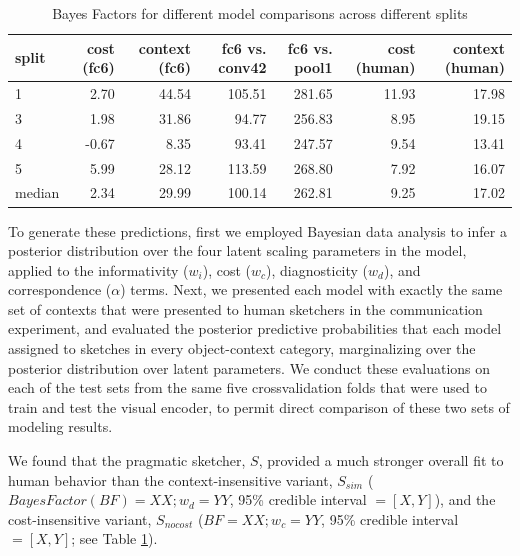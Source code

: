 \documentclass[9pt,twocolumn,twoside]{pnas-new}
\begin{document}
\begin{table}[ht]
\centering
\begin{tabular}{lrrrrrr}
  \hline
split & \multicolumn{1}{p{0.35in}}{\centering cost (fc6)} & \multicolumn{1}{p{0.35in}}{\centering context (fc6)} & \multicolumn{1}{p{0.35in}}{\centering fc6 vs. conv42} & \multicolumn{1}{p{0.35in}}{\centering fc6 vs. pool1} & \multicolumn{1}{p{0.35in}}{\centering cost (human)} & \multicolumn{1}{p{0.35in}}{\centering context (human)} \\ 
  \hline
1 & 2.70 & 44.54 & 105.51 & 281.65 & 11.93 & 17.98 \\ 
  3 & 1.98 & 31.86 & 94.77 & 256.83 & 8.95 & 19.15 \\ 
  4 & -0.67 & 8.35 & 93.41 & 247.57 & 9.54 & 13.41 \\ 
  5 & 5.99 & 28.12 & 113.59 & 268.80 & 7.92 & 16.07 \\ 
  median & 2.34 & 29.99 & 100.14 & 262.81 & 9.25 & 17.02 \\ 
   \hline
\end{tabular}
\caption{Bayes Factors for different model comparisons across different splits}
\label{model_comparison}
\end{table}

To generate these predictions, first we employed Bayesian data analysis to infer a posterior distribution over the four latent scaling parameters in the model, applied to the informativity ($w_{i}$), cost ($w_{c}$), diagnosticity ($w_{d}$), and correspondence ($\alpha$) terms. 
Next, we presented each model with exactly the same set of contexts that were presented to human sketchers in the communication experiment, and evaluated the posterior predictive probabilities that each model assigned to sketches in every object-context category, marginalizing over the posterior distribution over latent parameters. 
We conduct these evaluations on each of the test sets from the same five crossvalidation folds that were used to train and test the visual encoder, to permit direct comparison of these two sets of modeling results. 

We found that the pragmatic sketcher, $S$, provided a much stronger overall fit to human behavior than the context-insensitive variant, $S_{sim}$ ($Bayes Factor (BF) = XX; w_d = YY$, 95\% credible interval $= [X, Y]$), and the cost-insensitive variant, $S_{nocost}$ ($BF = XX; w_c = YY$, 95\% credible interval $=[X, Y]$; see Table \ref{model_comparison}). 
\end{document}
